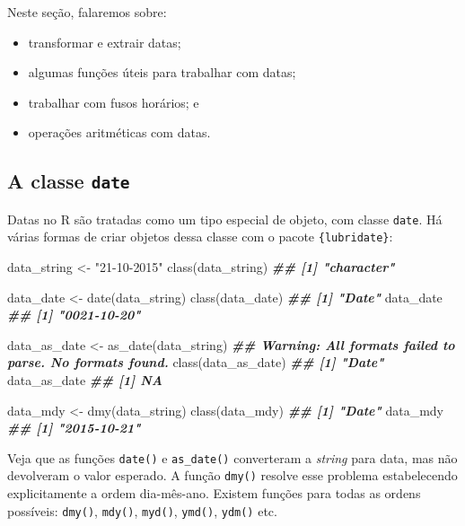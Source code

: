 \documentclass[
]{book}
\newenvironment{Shaded}{\begin{snugshade}}{\end{snugshade}}
\newcommand{\DocumentationTok}[1]{\textcolor[rgb]{0.56,0.35,0.01}{\textbf{\textit{#1}}}}
\newcommand{\FunctionTok}[1]{\textcolor[rgb]{0.00,0.00,0.00}{#1}}
\newcommand{\NormalTok}[1]{#1}
\newcommand{\OtherTok}[1]{\textcolor[rgb]{0.56,0.35,0.01}{#1}}
\newcommand{\StringTok}[1]{\textcolor[rgb]{0.31,0.60,0.02}{#1}}
\providecommand{\tightlist}{%
  \setlength{\itemsep}{0pt}\setlength{\parskip}{0pt}}
\begin{document}
Neste seção, falaremos sobre:

\begin{itemize}
\tightlist
\item
  transformar e extrair datas;
\item
  algumas funções úteis para trabalhar com datas;
\item
  trabalhar com fusos horários; e
\item
  operações aritméticas com datas.
\end{itemize}

\hypertarget{a-classe-date}{%
\subsection{\texorpdfstring{A classe \texttt{date}}{A classe date}}\label{a-classe-date}}

Datas no R são tratadas como um tipo especial de objeto, com classe \texttt{date}. Há várias formas de criar objetos dessa classe com o pacote \texttt{\{lubridate\}}:

\begin{Shaded}
\begin{Highlighting}[]
\NormalTok{data\_string }\OtherTok{\textless{}{-}} \StringTok{"21{-}10{-}2015"}
\FunctionTok{class}\NormalTok{(data\_string)}
\DocumentationTok{\#\# [1] "character"}

\NormalTok{data\_date }\OtherTok{\textless{}{-}} \FunctionTok{date}\NormalTok{(data\_string)}
\FunctionTok{class}\NormalTok{(data\_date)}
\DocumentationTok{\#\# [1] "Date"}
\NormalTok{data\_date}
\DocumentationTok{\#\# [1] "0021{-}10{-}20"}

\NormalTok{data\_as\_date }\OtherTok{\textless{}{-}} \FunctionTok{as\_date}\NormalTok{(data\_string)}
\DocumentationTok{\#\# Warning: All formats failed to parse. No formats found.}
\FunctionTok{class}\NormalTok{(data\_as\_date)}
\DocumentationTok{\#\# [1] "Date"}
\NormalTok{data\_as\_date}
\DocumentationTok{\#\# [1] NA}

\NormalTok{data\_mdy }\OtherTok{\textless{}{-}} \FunctionTok{dmy}\NormalTok{(data\_string)}
\FunctionTok{class}\NormalTok{(data\_mdy)}
\DocumentationTok{\#\# [1] "Date"}
\NormalTok{data\_mdy}
\DocumentationTok{\#\# [1] "2015{-}10{-}21"}
\end{Highlighting}
\end{Shaded}

Veja que as funções \texttt{date()} e \texttt{as\_date()} converteram a \emph{string} para data, mas não devolveram o valor esperado. A função \texttt{dmy()} resolve esse problema estabelecendo explicitamente a ordem dia-mês-ano. Existem funções para todas as ordens possíveis: \texttt{dmy()}, \texttt{mdy()}, \texttt{myd()}, \texttt{ymd()}, \texttt{ydm()} etc.
\end{document}
